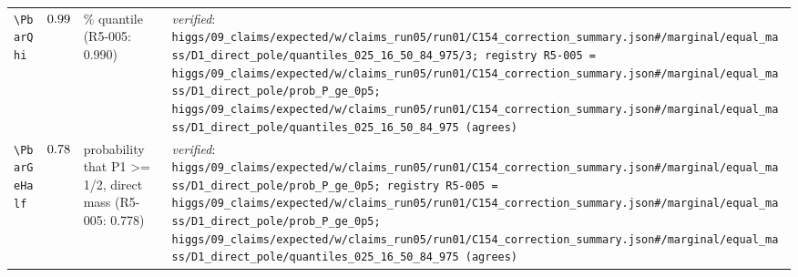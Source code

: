 {\begin{longtable}{@{}>{\raggedright\arraybackslash}p{}>{\raggedright\arraybackslash}p{}>{\raggedright\arraybackslash}p{}>{\raggedright\arraybackslash}p{}@{}}
\texttt{\textbackslash PbarQhi} & $0.99$ & 84\% quantile (R5-005: 0.990) & \emph{verified}: \texttt{higgs/\allowbreak{}09\_\allowbreak{}claims/\allowbreak{}expected/\allowbreak{}w/\allowbreak{}claims\_\allowbreak{}run05/\allowbreak{}run01/\allowbreak{}C154\_\allowbreak{}correction\_\allowbreak{}summary.json\#/\allowbreak{}marginal/\allowbreak{}equal\_\allowbreak{}mass/\allowbreak{}D1\_\allowbreak{}direct\_\allowbreak{}pole/\allowbreak{}quantiles\_\allowbreak{}025\_\allowbreak{}16\_\allowbreak{}50\_\allowbreak{}84\_\allowbreak{}975/\allowbreak{}3; registry R5-005 = higgs/\allowbreak{}09\_\allowbreak{}claims/\allowbreak{}expected/\allowbreak{}w/\allowbreak{}claims\_\allowbreak{}run05/\allowbreak{}run01/\allowbreak{}C154\_\allowbreak{}correction\_\allowbreak{}summary.json\#/\allowbreak{}marginal/\allowbreak{}equal\_\allowbreak{}mass/\allowbreak{}D1\_\allowbreak{}direct\_\allowbreak{}pole/\allowbreak{}prob\_\allowbreak{}P\_\allowbreak{}ge\_\allowbreak{}0p5; higgs/\allowbreak{}09\_\allowbreak{}claims/\allowbreak{}expected/\allowbreak{}w/\allowbreak{}claims\_\allowbreak{}run05/\allowbreak{}run01/\allowbreak{}C154\_\allowbreak{}correction\_\allowbreak{}summary.json\#/\allowbreak{}marginal/\allowbreak{}equal\_\allowbreak{}mass/\allowbreak{}D1\_\allowbreak{}direct\_\allowbreak{}pole/\allowbreak{}quantiles\_\allowbreak{}025\_\allowbreak{}16\_\allowbreak{}50\_\allowbreak{}84\_\allowbreak{}975 (agrees)} \\
\texttt{\textbackslash PbarGeHalf} & $0.78$ & probability that P1 \textgreater{}= 1/\allowbreak{}2, direct mass (R5-005: 0.778) & \emph{verified}: \texttt{higgs/\allowbreak{}09\_\allowbreak{}claims/\allowbreak{}expected/\allowbreak{}w/\allowbreak{}claims\_\allowbreak{}run05/\allowbreak{}run01/\allowbreak{}C154\_\allowbreak{}correction\_\allowbreak{}summary.json\#/\allowbreak{}marginal/\allowbreak{}equal\_\allowbreak{}mass/\allowbreak{}D1\_\allowbreak{}direct\_\allowbreak{}pole/\allowbreak{}prob\_\allowbreak{}P\_\allowbreak{}ge\_\allowbreak{}0p5; registry R5-005 = higgs/\allowbreak{}09\_\allowbreak{}claims/\allowbreak{}expected/\allowbreak{}w/\allowbreak{}claims\_\allowbreak{}run05/\allowbreak{}run01/\allowbreak{}C154\_\allowbreak{}correction\_\allowbreak{}summary.json\#/\allowbreak{}marginal/\allowbreak{}equal\_\allowbreak{}mass/\allowbreak{}D1\_\allowbreak{}direct\_\allowbreak{}pole/\allowbreak{}prob\_\allowbreak{}P\_\allowbreak{}ge\_\allowbreak{}0p5; higgs/\allowbreak{}09\_\allowbreak{}claims/\allowbreak{}expected/\allowbreak{}w/\allowbreak{}claims\_\allowbreak{}run05/\allowbreak{}run01/\allowbreak{}C154\_\allowbreak{}correction\_\allowbreak{}summary.json\#/\allowbreak{}marginal/\allowbreak{}equal\_\allowbreak{}mass/\allowbreak{}D1\_\allowbreak{}direct\_\allowbreak{}pole/\allowbreak{}quantiles\_\allowbreak{}025\_\allowbreak{}16\_\allowbreak{}50\_\allowbreak{}84\_\allowbreak{}975 (agrees)} \\

\end{longtable}}
